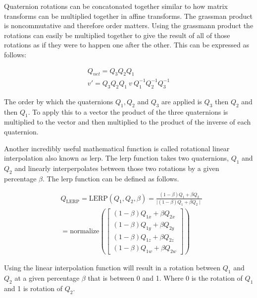 \noindent
Quaternion rotations can be concatonated together similar to how matrix transforms can be multiplied together in affine transforms. The grassman product is noncommutative and therefore order matters. Using the grassmann product the rotations can easily be multiplied together to give the result of all of those rotations as if they were to happen one after the other. This can be expressed as follows:

\begin{equation}
\begin{aligned}
Q_{net} = Q_3 Q_2 Q_1\\
v' = Q_3 Q_2 Q_1~ v~ Q_{1}^{-1} Q_{2}^{-1} Q_{3}^{-1}
\end{aligned}
\end{equation}

\noindent
The order by which the quaternions $Q_1, Q_2$ and $Q_3$ are applied is $Q_3$ then $Q_2$ and then $Q_1$. To apply this to a vector the product of the three quaternions is multiplied to the vector and then multiplied to the product of the inverse of each quaternion. 

Another incredibly useful mathematical function is called rotational linear interpolation also known as \acrshort{lerp}. The \acrshort{lerp} function takes two quaternions, $Q_1$ and $Q_2$ and linearly interperpolates between those two rotations by a given percentage  $\beta$. The \acrshort{lerp} function can be defined as follows.

\begin{equation}
\begin{aligned}
& Q_{\text{LERP}} = \text{LERP}(Q_1, Q_2, \beta) = \frac{(1-\beta)Q_1 + \beta Q_2}{\mid(1-\beta)Q_1 + \beta Q_2\mid} \\
& = \text{normalize} \left(\begin{bmatrix}
(1 - \beta) Q_{1x} + \beta Q_{2x}\\
(1 - \beta) Q_{1y} + \beta Q_{2y}\\
(1 - \beta) Q_{1z} + \beta Q_{2z}\\
(1 - \beta) Q_{1w} + \beta Q_{2w}					
\end{bmatrix}\right)
\end{aligned}
\end{equation}

\noindent
Using the linear interpolation function will result in a rotation between $Q_1$ and $Q_2$ at a given percentage $\beta$ that is between 0 and 1. Where 0 is the rotation of $Q_1$ and 1 is rotation of $Q_2$.

